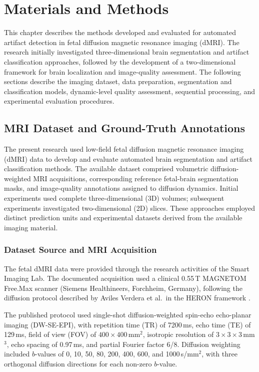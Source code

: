 \chapter{Materials and Methods}

This chapter describes the methods developed and evaluated for automated artifact detection in fetal diffusion magnetic resonance imaging (dMRI). The research initially investigated three-dimensional brain segmentation and artifact classification approaches, followed by the development of a two-dimensional framework for brain localization and image-quality assessment. The following sections describe the imaging dataset, data preparation, segmentation and classification models, dynamic-level quality assessment, sequential processing, and experimental evaluation procedures.

\section{MRI Dataset and Ground-Truth Annotations}
\label{sec:mri-dataset-ground-truth}

The present research used low-field fetal diffusion magnetic resonance imaging (dMRI) data to develop and evaluate automated brain segmentation and artifact classification methods. The available dataset comprised volumetric diffusion-weighted MRI acquisitions, corresponding reference fetal-brain segmentation masks, and image-quality annotations assigned to diffusion dynamics. Initial experiments used complete three-dimensional (3D) volumes; subsequent experiments investigated two-dimensional (2D) slices. These approaches employed distinct prediction units and experimental datasets derived from the available imaging material.

\subsection{Dataset Source and MRI Acquisition}

The fetal dMRI data were provided through the research activities of the Smart Imaging Lab. The documented acquisition used a clinical 0.55\,T MAGNETOM Free.Max scanner (Siemens Healthineers, Forchheim, Germany), following the diffusion protocol described by Aviles Verdera et al.\ in the HERON framework \autocite{avilesverdera2025heron}.

The published protocol used single-shot diffusion-weighted spin-echo echo-planar imaging (DW-SE-EPI), with repetition time (TR) of 7200\,ms, echo time (TE) of 129\,ms, field of view (FOV) of $400\times400$\,mm$^2$, isotropic resolution of $3\times3\times3$\,mm$^3$, echo spacing of 0.97\,ms, and partial Fourier factor 6/8. Diffusion weighting included $b$-values of 0, 10, 50, 80, 200, 400, 600, and 1000\,s/mm$^2$, with three orthogonal diffusion directions for each non-zero $b$-value.

